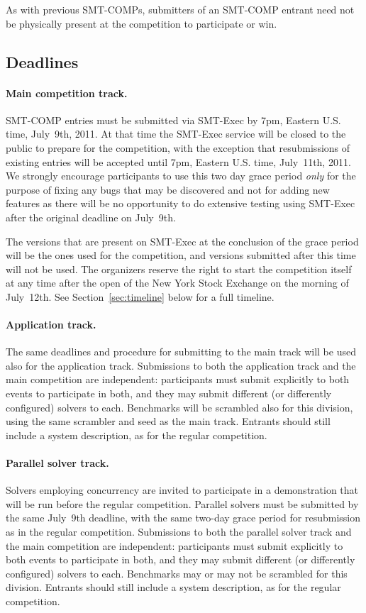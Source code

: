 \documentclass[12pt]{article}
\begin{document}
As with previous SMT-COMPs, submitters of an SMT-COMP entrant need not 
be physically present at the competition to
participate or win.

\subsection*{Deadlines} %

\paragraph{Main competition track.} %
SMT-COMP entries must be submitted via SMT-Exec by 7pm, Eastern U.S.
time, July~9th, 2011.  At that time the SMT-Exec service will be
closed to the public to prepare for the competition, with the
exception that resubmissions of existing entries will be accepted
until 7pm, Eastern U.S. time, July~11th, 2011.  We strongly encourage
participants to use this two day grace period \emph{only} for the
purpose of fixing any bugs that may be discovered and not for adding
new features as there will be no opportunity to do extensive testing
using SMT-Exec after the original deadline on July~9th.

The versions that are present on SMT-Exec at the conclusion of the
grace period will be the ones used for the competition, and versions
submitted after this time will not be used.  The organizers reserve
the right to start the competition itself at any time after the open
of the New York Stock Exchange on the morning of July~12th.  See
Section~\ref{sec:timeline} below for a full timeline.

\paragraph{Application track.} %
The same deadlines and procedure for submitting to the main track will be used
also for the application track. Submissions to both the application track and
the main competition are independent: participants must submit explicitly to
both events to participate in both, and they may submit different (or
differently configured) solvers to each.  Benchmarks will be scrambled also
for this division, using the same scrambler and seed as the main track.
Entrants should still include a system description, as for the regular
competition.

\paragraph{Parallel solver track.} %
Solvers employing concurrency are invited to participate in a
demonstration that will be run before the regular competition.
Parallel solvers must be submitted by the same July~9th deadline,
with the same two-day grace period for resubmission as in the regular
competition.  Submissions to both the parallel solver track
and the main competition are independent: participants must submit
explicitly to both events to participate in both, and they may submit
different (or differently configured) solvers to each.  Benchmarks may
or may not be scrambled for this division.  Entrants should still
include a system description, as for the regular competition.
\end{document}
